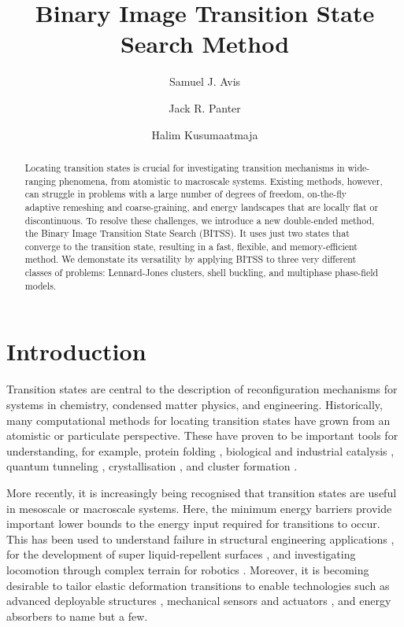 \documentclass[twocolumn,10pt]{revtex4-2}
\begin{document}
\title{Binary Image Transition State Search Method}
\author{Samuel J. Avis}
\author{Jack R. Panter}
\author{Halim Kusumaatmaja}

\begin{abstract}
  Locating transition states is crucial for investigating transition mechanisms in wide-ranging phenomena, from atomistic to macroscale systems.
  Existing methods, however, can struggle in problems with a large number of degrees of freedom, on-the-fly adaptive remeshing and coarse-graining, and energy landscapes that are locally flat or discontinuous.
  To resolve these challenges, we introduce a new double-ended method, the Binary Image Transition State Search (BITSS).
  It uses just two states that converge to the transition state, resulting in a fast, flexible, and memory-efficient method.
  We demonstate its versatility by applying BITSS to three very different classes of problems: Lennard-Jones clusters, shell buckling, and multiphase phase-field models.
\end{abstract}

\maketitle


\section{Introduction}
Transition states are central to the description of reconfiguration mechanisms for systems in chemistry, condensed matter physics, and engineering.
Historically, many computational methods for locating transition states have grown from an atomistic or particulate perspective.
These have proven to be important tools for understanding, for example, protein folding \cite{Bryngelson1995,Onuchic1997}, biological and industrial catalysis \cite{Boehr2006,Kerns2015,Guo2018a}, quantum tunneling \cite{Richardson2016,Vaillant2019}, crystallisation \cite{Richard2018}, and cluster formation \cite{Wales1998,Wales2012}.

More recently, it is increasingly being recognised that transition states are useful in mesoscale or macroscale systems.
Here, the minimum energy barriers provide important lower bounds to the energy input required for transitions to occur.
This has been used to understand failure in structural engineering applications \cite{Panter2019,Hutchinson2018}, for the development of super liquid-repellent surfaces \cite{Zhang2014,Panter2019b,Amabili2017}, and investigating locomotion through complex terrain for robotics \cite{Othayoth2020}.
Moreover, it is becoming desirable to tailor elastic deformation transitions to enable technologies such as advanced deployable structures \cite{Filipov2015,Zhai2018}, mechanical sensors and actuators \cite{Bertoldi2017,Truby2016,Chi2022,Bonfanti2020}, and energy absorbers \cite{Shan2015,Giri2021} to name but a few.
\end{document}
